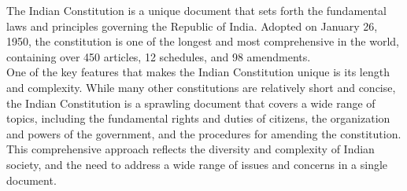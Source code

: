 \documentclass[11pt]{article}
\begin{document}
The Indian Constitution is a unique document that sets forth the fundamental laws and principles governing the Republic of India. Adopted on January 26, 1950, the constitution is one of the longest and most comprehensive in the world, containing over 450 articles, 12 schedules, and 98 amendments.\\

One of the key features that makes the Indian Constitution unique is its length and complexity. While many other constitutions are relatively short and concise, the Indian Constitution is a sprawling document that covers a wide range of topics, including the fundamental rights and duties of citizens, the organization and powers of the government, and the procedures for amending the constitution. This comprehensive approach reflects the diversity and complexity of Indian society, and the need to address a wide range of issues and concerns in a single document.\\
\end{document}
